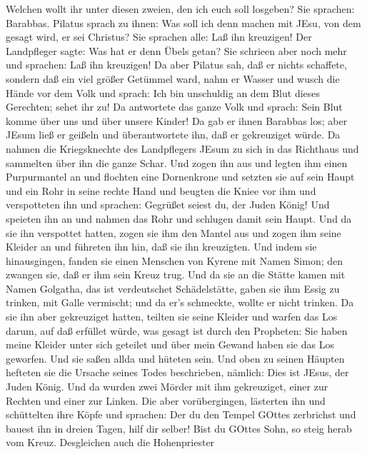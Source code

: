 Welchen wollt ihr unter diesen zweien, den ich euch soll losgeben? Sie
sprachen: Barabbas.  Pilatus sprach zu ihnen: Was soll ich
denn machen mit JEsu, von dem gesagt wird, er sei Christus? Sie sprachen
alle: Laß ihn kreuzigen!  Der Landpfleger sagte: Was hat er
denn Übels getan? Sie schrieen aber noch mehr und sprachen: Laß ihn
kreuzigen!  Da aber Pilatus sah, daß er nichts schaffete,
sondern daß ein viel größer Getümmel ward, nahm er Wasser und wusch die
Hände vor dem Volk und sprach: Ich bin unschuldig an dem Blut dieses
Gerechten; sehet ihr zu!  Da antwortete das ganze Volk und
sprach: Sein Blut komme über uns und über unsere Kinder! 
Da gab er ihnen Barabbas los; aber JEsum ließ er geißeln und
überantwortete ihn, daß er gekreuziget würde.  Da nahmen
die Kriegsknechte des Landpflegers JEsum zu sich in das Richthaus und
sammelten über ihn die ganze Schar.  Und zogen ihn aus und
legten ihm einen Purpurmantel an  und flochten eine
Dornenkrone und setzten sie auf sein Haupt und ein Rohr in seine rechte
Hand und beugten die Kniee vor ihm und verspotteten ihn und sprachen:
Gegrüßet seiest du, der Juden König!  Und speieten ihn an
und nahmen das Rohr und schlugen damit sein Haupt.  Und da
sie ihn verspottet hatten, zogen sie ihm den Mantel aus und zogen ihm
seine Kleider an und führeten ihn hin, daß sie ihn kreuzigten.
 Und indem sie hinausgingen, fanden sie einen Menschen von
Kyrene mit Namen Simon; den zwangen sie, daß er ihm sein Kreuz trug.
 Und da sie an die Stätte kamen mit Namen Golgatha, das ist
verdeutschet Schädelstätte,  gaben sie ihm Essig zu
trinken, mit Galle vermischt; und da er's schmeckte, wollte er nicht
trinken.  Da sie ihn aber gekreuziget hatten, teilten sie
seine Kleider und warfen das Los darum, auf daß erfüllet würde, was
gesagt ist durch den Propheten: Sie haben meine Kleider unter sich
geteilet und über mein Gewand haben sie das Los geworfen. 
Und sie saßen allda und hüteten sein.  Und oben zu seinen
Häupten hefteten sie die Ursache seines Todes beschrieben, nämlich: Dies
ist JEsus, der Juden König.  Und da wurden zwei Mörder mit
ihm gekreuziget, einer zur Rechten und einer zur Linken. 
Die aber vorübergingen, lästerten ihn und schüttelten ihre Köpfe
 und sprachen: Der du den Tempel GOttes zerbrichst und
bauest ihn in dreien Tagen, hilf dir selber! Bist du GOttes Sohn, so
steig herab vom Kreuz.  Desgleichen auch die Hohenpriester
